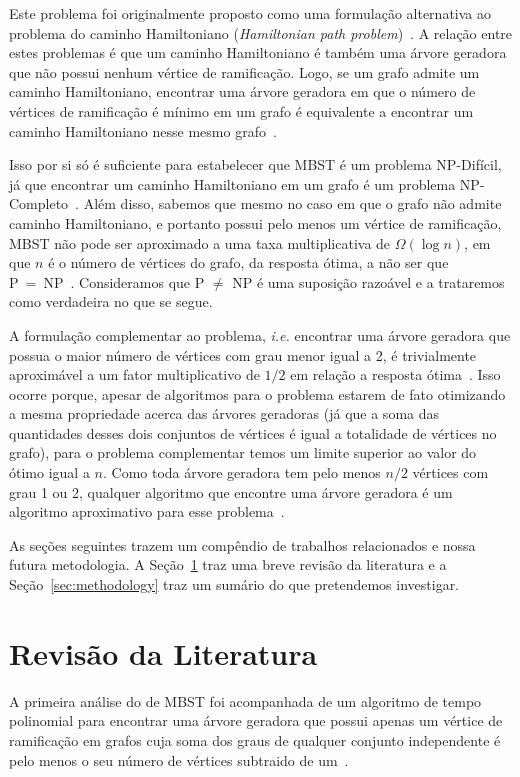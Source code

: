\documentclass[conference]{IEEEtran}
\begin{document}
Este problema foi originalmente proposto como uma formulação alternativa ao problema do caminho Hamiltoniano (\textit{Hamiltonian path problem})~\cite{gargano2004}.
A relação entre estes problemas é que um caminho Hamiltoniano é também uma árvore geradora que não possui nenhum vértice de ramificação.
Logo, se um grafo admite um caminho Hamiltoniano, encontrar uma árvore geradora em que o número de vértices de ramificação é mínimo em um grafo é equivalente a encontrar um caminho Hamiltoniano nesse mesmo grafo~\cite{gargano2004}.

Isso por si só é suficiente para estabelecer que MBST é um problema NP-Difícil, já que encontrar um caminho Hamiltoniano em um grafo é um problema NP-Completo~\cite{karp1972}.
Além disso, sabemos que mesmo no caso em que o grafo não admite caminho Hamiltoniano, e portanto possui pelo menos um vértice de ramificação, MBST não pode ser aproximado a uma taxa multiplicativa de $\Omega(\log n)$, em que $n$ é o número de vértices do grafo, da resposta ótima, a não ser que P~=~NP~\cite{salamon2010}.
Consideramos que P $\neq$ NP é uma suposição razoável e a trataremos como verdadeira no que se segue.

A formulação complementar ao problema, \textit{i.e.} encontrar uma árvore geradora que possua o maior número de vértices com grau menor igual a 2, é trivialmente aproximável a um fator multiplicativo de $1/2$ em relação a resposta ótima~\cite{chimani2015}.
Isso ocorre porque, apesar de algoritmos para o problema estarem de fato otimizando a mesma propriedade acerca das árvores geradoras (já que a soma das quantidades desses dois conjuntos de vértices é igual a totalidade de vértices no grafo), para o problema complementar temos um limite superior ao valor do ótimo igual a $n$.
Como toda árvore geradora tem pelo menos $n/2$ vértices com grau 1 ou 2, qualquer algoritmo que encontre uma árvore geradora é um algoritmo aproximativo para esse problema~\cite{chimani2015}.

As seções seguintes trazem um compêndio de trabalhos relacionados e nossa futura metodologia.
A Seção~\ref{sec:review} traz uma breve revisão da literatura e a Seção~\ref{sec:methodology} traz um sumário do que pretendemos investigar.

\section{Revisão da Literatura} \label{sec:review}

A primeira análise do de MBST foi acompanhada de um algoritmo de tempo polinomial para encontrar uma árvore geradora que possui apenas um vértice de ramificação em grafos cuja soma dos graus de qualquer conjunto independente é pelo menos o seu número de vértices subtraido de um~\cite{gargano2004}.
\end{document}
